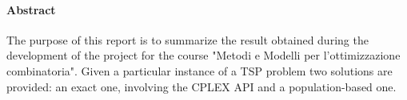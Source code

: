 \paragraph{Abstract} 
The purpose of this report is to summarize the result obtained during the development
of the project for the course "Metodi e Modelli per l'ottimizzazione combinatoria".
Given a particular instance of a TSP problem two solutions are provided: an exact one,
involving the CPLEX API and a population-based one.